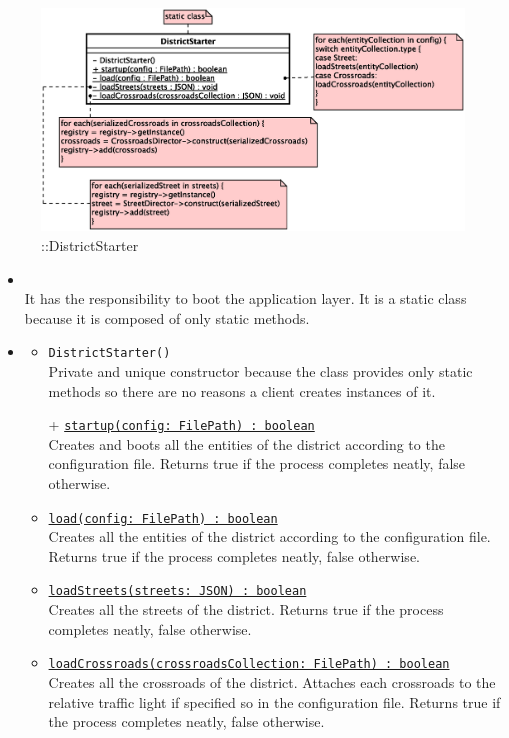\begin{figure}[h]
\centering
\includegraphics[scale=0.6,keepaspectratio]{images/solution/app/backend/district_starter.eps}
\caption{\pReactive::DistrictStarter}
\label{fig:sd-app-district-starter}
\end{figure}
\FloatBarrier
\begin{itemize}
  \item \textbf{\descr} \\
  It has the responsibility to boot the application layer.
  It is a static class because it is composed of only static methods.
  \item \textbf{\ops}
  \begin{itemize}
    \item \texttt{DistrictStarter()} \\
    Private and unique constructor because the class provides only static methods 
    so there are no reasons a client creates instances of it.
    \item[+] \texttt{\underline{startup(config: FilePath) : boolean}} \\
    Creates and boots all the entities of the district according to the 
    configuration file.
    Returns true if the process completes neatly, false otherwise.
    \item \texttt{\underline{load(config: FilePath) : boolean}} \\
    Creates all the entities of the district according to the 
    configuration file.
    Returns true if the process completes neatly, false otherwise.
    \item \texttt{\underline{loadStreets(streets: JSON) : boolean}} \\
    Creates all the streets of the district.
    Returns true if the process completes neatly, false otherwise.
    \item \texttt{\underline{loadCrossroads(crossroadsCollection: FilePath) : boolean}} \\
    Creates all the crossroads of the district. 
    Attaches each crossroads to the relative traffic light
    if specified so in the configuration file. 
    Returns true if the process completes neatly, false otherwise.
  \end{itemize}
\end{itemize} 
